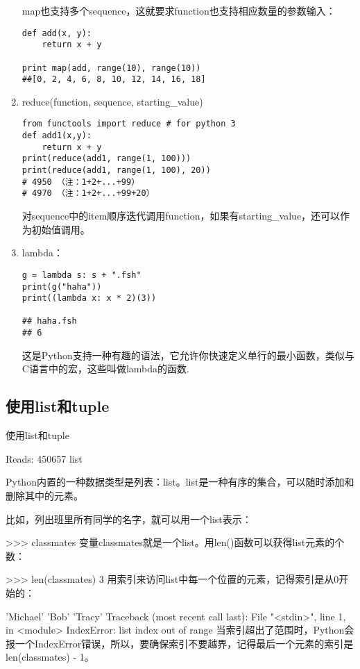 \begin{enumerate}
map也支持多个sequence，这就要求function也支持相应数量的参数输入：
\begin{verbatim}
def add(x, y):
    return x + y 

print map(add, range(10), range(10)) 
##[0, 2, 4, 6, 8, 10, 12, 14, 16, 18]
\end{verbatim}

\item reduce(function, sequence, starting\_value)
\begin{verbatim}
from functools import reduce # for python 3
def add1(x,y):
    return x + y
print(reduce(add1, range(1, 100)))
print(reduce(add1, range(1, 100), 20))
# 4950 （注：1+2+...+99）
# 4970 （注：1+2+...+99+20）
\end{verbatim}

对sequence中的item顺序迭代调用function，如果有starting\_value，还可以作为初始值调用。
\item lambda：
\begin{verbatim}
g = lambda s: s + ".fsh"
print(g("haha"))
print((lambda x: x * 2)(3))

## haha.fsh
## 6
\end{verbatim}

这是Python支持一种有趣的语法，它允许你快速定义单行的最小函数，类似与C语言中的宏，这些叫做lambda的函数.
\end{enumerate}

\subsection{使用list和tuple}

使用list和tuple

Reads: 450657
list

Python内置的一种数据类型是列表：list。list是一种有序的集合，可以随时添加和删除其中的元素。

比如，列出班里所有同学的名字，就可以用一个list表示：

>>> classmates
变量classmates就是一个list。用len()函数可以获得list元素的个数：

>>> len(classmates)
3
用索引来访问list中每一个位置的元素，记得索引是从0开始的：

'Michael'
'Bob'
'Tracy'
Traceback (most recent call last):
  File "<stdin>", line 1, in <module>
IndexError: list index out of range
当索引超出了范围时，Python会报一个IndexError错误，所以，要确保索引不要越界，记得最后一个元素的索引是len(classmates) - 1。

